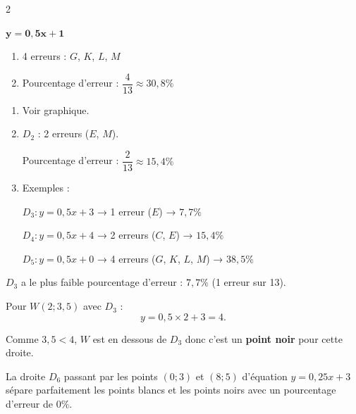 \begin{multicols}{2}

			\begin{MADenumerate}
				\item $\boldsymbol{y = 0{,}5x + 1}$

				\item
				\begin{enumerate}
					\item 4 erreurs : $G$, $K$, $L$, $M$
					\item Pourcentage d'erreur : $\dfrac{4}{13} \approx 30{,}8\%$
				\end{enumerate}

				\item
				\begin{enumerate}
					\item Voir graphique.
					\item $D_2$ : 2 erreurs ($E$, $M$).

					      Pourcentage d'erreur : $\dfrac{2}{13} \approx 15{,}4\%$
					\item Exemples :

					      $D_3 : y = 0{,}5x + 3$ → 1 erreur ($E$) → $ 7{,}7\%$

					      $D_4 : y = 0{,}5x + 4$ → 2 erreurs ($C$, $E$) → $15{,}4\%$

					      $D_5 : y = 0{,}5x + 0$ → 4 erreurs ($G$, $K$, $L$, $M$) → $38{,}5\%$

				\end{enumerate}

				\item $D_3$ a le plus faible pourcentage d'erreur : $7{,}7\%$ (1 erreur sur 13).

				\item Pour $W(2;3{,}5)$ avec $D_3$ : $$y = 0{,}5\times 2 + 3 = 4.$$

				Comme $3{,}5 < 4$, $W$ est en dessous de $D_3$ donc c'est un \textbf{point noir} pour cette droite.

				\item La droite $D_6$ passant par les points $(0;3)$ et $(8;5)$ d'équation $y = 0{,}25x + 3$ sépare parfaitement les points blancs et les points noirs avec un pourcentage d'erreur de $0\%$.
			\end{MADenumerate}
		\end{multicols}
